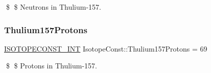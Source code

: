 \$ \$ Neutrons in Thulium-\/157. \mbox{\label{group___isotope_const-_thulium-_tm157_ga09bd11a92ea4394a13c98ca9961426b8}} 
\subsubsection{\texorpdfstring{Thulium157\+Protons}{Thulium157Protons}}
{\footnotesize\ttfamily \mbox{\hyperlink{group___isotope_const-_macros_ga5f18360b3e99483a35c32d789e62621c}{I\+S\+O\+T\+O\+P\+E\+C\+O\+N\+S\+T\+\_\+\+I\+NT}} Isotope\+Const\+::\+Thulium157\+Protons = 69}

\$ \$ Protons in Thulium-\/157. 